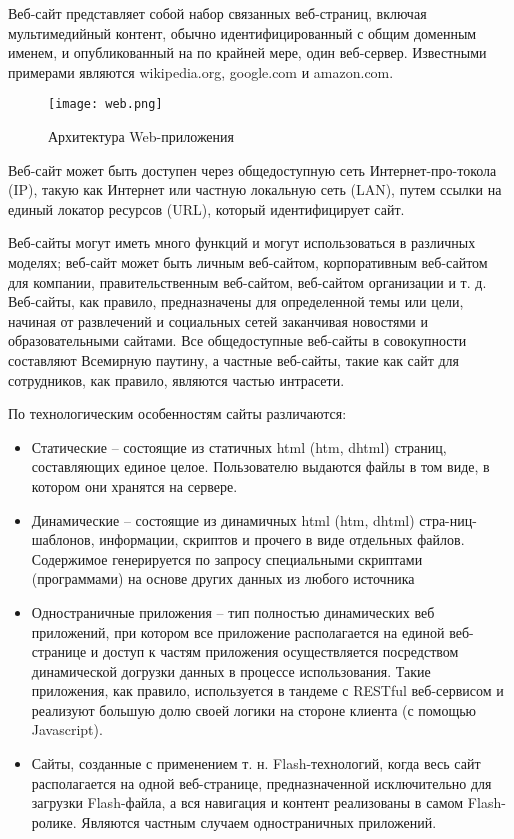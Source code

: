 Веб-сайт представляет собой набор связанных веб-страниц, включая мультимедийный контент, обычно идентифицированный с общим доменным именем, и опубликованный на
по крайней мере, один веб-сервер. Известными примерами являются wikipedia.org, google.com и amazon.com.

\begin{figure}[ht]
  \centering
    \texttt{[image: web.png]}
    \caption{Архитектура Web-приложения}
    \label{figure:domain:web}
  \end{figure}

Веб-сайт может быть доступен через общедоступную сеть Интернет-про-токола (IP), такую как Интернет или частную локальную сеть (LAN), путем ссылки на
единый локатор ресурсов (URL), который идентифицирует сайт.

Веб-сайты могут иметь много функций и могут использоваться в различных моделях; веб-сайт может быть личным веб-сайтом, корпоративным веб-сайтом для компании, правительственным
веб-сайтом, веб-сайтом организации и т. д. Веб-сайты, как правило, предназначены для определенной темы или цели, начиная от развлечений и социальных сетей
заканчивая новостями и образовательными сайтами. Все общедоступные веб-сайты в совокупности составляют Всемирную паутину, а частные веб-сайты, такие как
сайт для сотрудников, как правило, являются частью интрасети.

По технологическим особенностям сайты различаются:

\begin{itemize}
\item Статические -- состоящие из статичных html (htm, dhtml) страниц, составляющих единое целое. Пользователю выдаются файлы в том виде, в котором они хранятся на сервере.
\item Динамические -- состоящие из динамичных html (htm, dhtml) стра-ниц-шаблонов, информации, скриптов и прочего в виде отдельных файлов. Содержимое генерируется по запросу
специальными скриптами (программами) на основе других данных из любого источника
\item Одностраничные приложения -- тип полностью динамических веб приложений, при котором все приложение располагается на единой веб-странице и доступ к частям приложения
осуществляется посредством динамической догрузки данных в процессе использования. Такие приложения, как правило, используется в тандеме с RESTful веб-сервисом и реализуют
большую долю своей логики на стороне клиента (с помощью Javascript).
\item Сайты, созданные с применением т. н. Flash-технологий, когда весь сайт располагается на одной веб-странице, предназначенной исключительно для загрузки Flash-файла,
а вся навигация и контент реализованы в самом Flash-ролике. Являются частным случаем одностраничных приложений.
\end{itemize}

